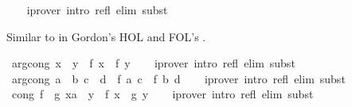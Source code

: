 \begin{isabellebody}
%
\isadelimproof
\ \ %
\endisadelimproof
%
\isatagproof
{}\isamarkupfalse%
\ {\isacharparenleft}{\kern0pt}iprover\ intro{\isacharcolon}{\kern0pt}\ refl\ elim{\isacharcolon}{\kern0pt}\ subst{\isacharparenright}{\kern0pt}%
\endisatagproof
{\isafoldproof}%
%
\isadelimproof
%
\endisadelimproof
%
\begin{isamarkuptext}%
Similar to  in Gordon's HOL and FOL's .%
\end{isamarkuptext}\isamarkuptrue%
\isamarkupfalse%
\ arg{\isacharunderscore}{\kern0pt}cong{\isacharcolon}{\kern0pt}\ {\isachardoublequoteopen}x\ {\isacharequal}{\kern0pt}\ y\ {\isasymLongrightarrow}\ f\ x\ {\isacharequal}{\kern0pt}\ f\ y{\isachardoublequoteclose}\isanewline
%
\isadelimproof
\ \ %
\endisadelimproof
%
\isatagproof
{}\isamarkupfalse%
\ {\isacharparenleft}{\kern0pt}iprover\ intro{\isacharcolon}{\kern0pt}\ refl\ elim{\isacharcolon}{\kern0pt}\ subst{\isacharparenright}{\kern0pt}%
\endisatagproof
{\isafoldproof}%
%
\isadelimproof
\isanewline
%
\endisadelimproof
\isanewline
{}\isamarkupfalse%
\ arg{\isacharunderscore}{\kern0pt}cong{}{\isacharcolon}{\kern0pt}\ {\isachardoublequoteopen}{\isasymlbrakk}a\ {\isacharequal}{\kern0pt}\ b{\isacharsemicolon}{\kern0pt}\ c\ {\isacharequal}{\kern0pt}\ d{\isasymrbrakk}\ {\isasymLongrightarrow}\ f\ a\ c\ {\isacharequal}{\kern0pt}\ f\ b\ d{\isachardoublequoteclose}\isanewline
%
\isadelimproof
\ \ %
\endisadelimproof
%
\isatagproof
{}\isamarkupfalse%
\ {\isacharparenleft}{\kern0pt}iprover\ intro{\isacharcolon}{\kern0pt}\ refl\ elim{\isacharcolon}{\kern0pt}\ subst{\isacharparenright}{\kern0pt}%
\endisatagproof
{\isafoldproof}%
%
\isadelimproof
\isanewline
%
\endisadelimproof
\isanewline
{}\isamarkupfalse%
\ cong{\isacharcolon}{\kern0pt}\ {\isachardoublequoteopen}{\isasymlbrakk}f\ {\isacharequal}{\kern0pt}\ g{\isacharsemicolon}{\kern0pt}\ {\isacharparenleft}{\kern0pt}x{\isacharcolon}{\kern0pt}{\isacharcolon}{\kern0pt}{\isacharprime}{\kern0pt}a{\isacharparenright}{\kern0pt}\ {\isacharequal}{\kern0pt}\ y{\isasymrbrakk}\ {\isasymLongrightarrow}\ f\ x\ {\isacharequal}{\kern0pt}\ g\ y{\isachardoublequoteclose}\isanewline
%
\isadelimproof
\ \ %
\endisadelimproof
%
\isatagproof
{}\isamarkupfalse%
\ {\isacharparenleft}{\kern0pt}iprover\ intro{\isacharcolon}{\kern0pt}\ refl\ elim{\isacharcolon}{\kern0pt}\ subst{\isacharparenright}{\kern0pt}%
\endisatagproof
{\isafoldproof}%
%
\isadelimproof
\isanewline

\end{isabellebody}

